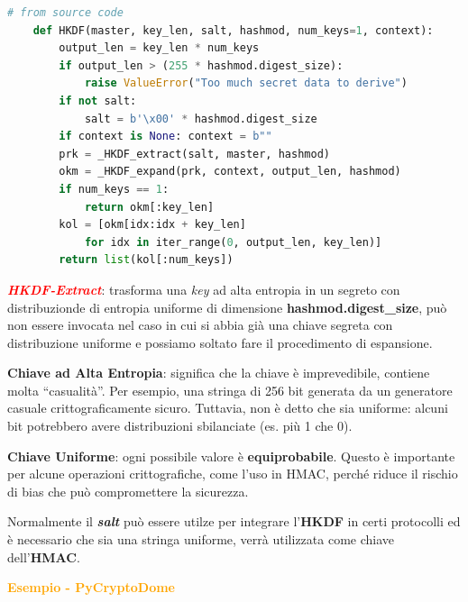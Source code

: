 \begin{lstlisting}[language=python, label={hkdf}]
    # from source code
    def HKDF(master, key_len, salt, hashmod, num_keys=1, context):
        output_len = key_len * num_keys
        if output_len > (255 * hashmod.digest_size):
            raise ValueError("Too much secret data to derive")
        if not salt:
            salt = b'\x00' * hashmod.digest_size
        if context is None: context = b""
        prk = _HKDF_extract(salt, master, hashmod)
        okm = _HKDF_expand(prk, context, output_len, hashmod)
        if num_keys == 1:
            return okm[:key_len]
        kol = [okm[idx:idx + key_len]
            for idx in iter_range(0, output_len, key_len)]
        return list(kol[:num_keys])
\end{lstlisting}

\begin{flushleft}
    \textcolor{red}{\textbf{\textit{HKDF-Extract}}}: trasforma una \textit{key} ad alta entropia in un segreto con distribuzionde di entropia uniforme di dimensione \textbf{hashmod.digest\_size}, può non essere invocata nel caso in cui si abbia già una chiave segreta con distribuzione uniforme e possiamo soltato fare il procedimento di espansione.

    \begin{center}
        \begin{minipage}[t]{0.45\textwidth}
            \textbf{Chiave ad Alta Entropia}: significa che la chiave è imprevedibile, contiene molta ``casualità''. Per esempio, una stringa di 256 bit generata da un generatore casuale crittograficamente sicuro. Tuttavia, non è detto che sia uniforme: alcuni bit potrebbero avere distribuzioni sbilanciate (es. più 1 che 0).
        \end{minipage}
        \hfill
        \begin{minipage}[t]{0.45\textwidth}
            \textbf{Chiave Uniforme}: ogni possibile valore è \textbf{equiprobabile}. Questo è importante per alcune operazioni crittografiche, come l'uso in HMAC, perché riduce il rischio di bias che può compromettere la sicurezza.
        \end{minipage}
    \end{center}

    Normalmente il \textbf{\textit{salt}} può essere utilze per integrare l'\textbf{HKDF} in certi protocolli ed è necessario che sia una stringa uniforme, verrà utilizzata come chiave dell'\textbf{HMAC}.

    \smallskip

    \textcolor{orange}{\textbf{Esempio - PyCryptoDome}}
\end{flushleft}

